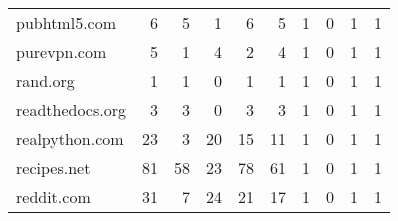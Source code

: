 \begin{tabular}{lrrrrrrrrr}
               pubhtml5.com &                                6 &                                  5 &                                      1 &                            6 &                           5 &                                   1 &                                      0 &                             1 &                            1 \\
                purevpn.com &                                5 &                                  1 &                                      4 &                            2 &                           4 &                                   1 &                                      0 &                             1 &                            1 \\
                   rand.org &                                1 &                                  1 &                                      0 &                            1 &                           1 &                                   1 &                                      0 &                             1 &                            1 \\
            readthedocs.org &                                3 &                                  3 &                                      0 &                            3 &                           3 &                                   1 &                                      0 &                             1 &                            1 \\
             realpython.com &                               23 &                                  3 &                                     20 &                           15 &                          11 &                                   1 &                                      0 &                             1 &                            1 \\
                recipes.net &                               81 &                                 58 &                                     23 &                           78 &                          61 &                                   1 &                                      0 &                             1 &                            1 \\
                 reddit.com &                               31 &                                  7 &                                     24 &                           21 &                          17 &                                   1 &                                      0 &                             1 &                            1 \\

\end{tabular}
